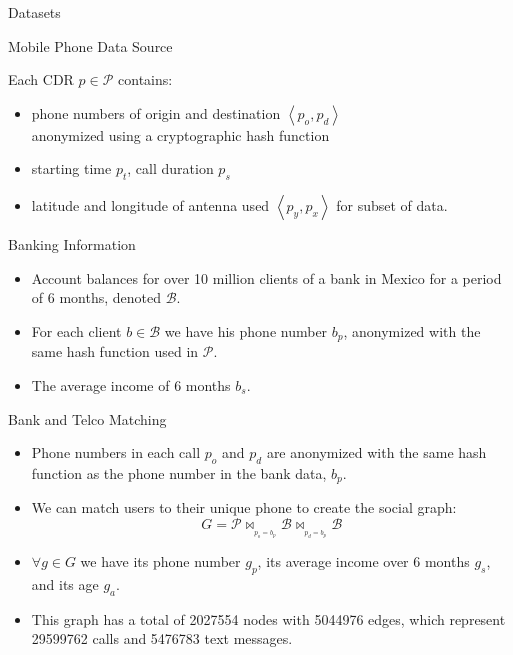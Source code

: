 \documentclass{beamer}
\newcommand{\mathB}{\mathcal{B}}
\newcommand{\mathP}{\mathcal{P}}
\begin{document}
\begin{frame}{Datasets}

\begin{block}{Mobile Phone Data Source}

Each CDR \( p \in \mathP \) contains:
\begin{itemize}
\item phone numbers of origin and destination \( \left< p_o, p_d \right> \) \\
 anonymized using a cryptographic hash function
\item starting time \( p_t \), call duration \( p_s \)
\item latitude and longitude of antenna used \( \left< p_y, p_x \right> \) for subset of data.
\end{itemize} 

\end{block}

\pause

\begin{block}{Banking Information}

\begin{itemize}
\item Account balances for over 10 million clients of a bank in Mexico for a period of 6 months, denoted \( \mathB \). 
\item For each client \( b \in \mathB \) we have his phone number \( b_p \), anonymized with the same hash function used in \( \mathP \).
\item The average income of 6 months \( b_s \).

\end{itemize}


\end{block}

\end{frame}


\begin{frame}{Bank and Telco Matching}

\begin{itemize}

\item Phone numbers in each call $ p_o $ and $ p_d $ are anonymized with the same hash function as the phone number in the bank data, $ b_p $.

\item We can match users to their unique phone to create the social graph:
$$ G = \mathP \bowtie_{_{p_o = b_p}} \mathB \bowtie_{_{p_d = b_p}} \mathB $$

\item \( \forall g \in G \) we have its phone number \( g_p \),  its average income over 6 months \( g_s \), and its age \( g_a \).

\item This graph has a total of \num{2027554} nodes with \num{5044976} edges, which represent \num{29599762} calls and \num{5476783} text messages.
\end{itemize}

\end{frame}
\end{document}
